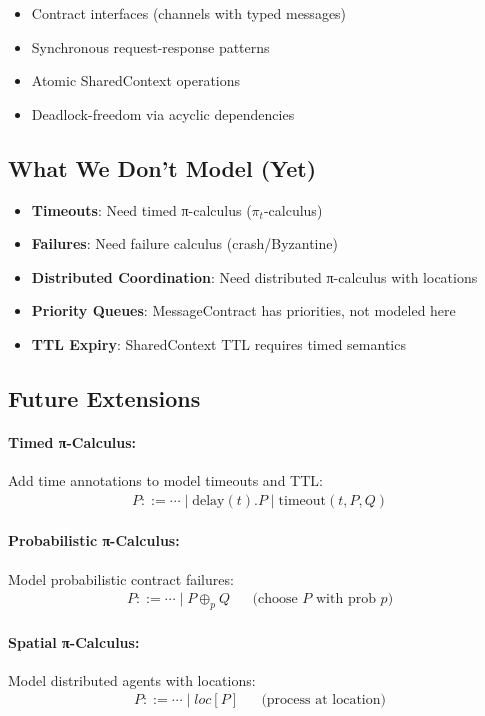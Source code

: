 \documentclass{article}
\begin{document}
\begin{itemize}
\item Contract interfaces (channels with typed messages)
\item Synchronous request-response patterns
\item Atomic SharedContext operations
\item Deadlock-freedom via acyclic dependencies
\end{itemize}

\subsection{What We Don't Model (Yet)}

\begin{itemize}
\item \textbf{Timeouts}: Need timed π-calculus ($\pi_t$-calculus)
\item \textbf{Failures}: Need failure calculus (crash/Byzantine)
\item \textbf{Distributed Coordination}: Need distributed π-calculus with locations
\item \textbf{Priority Queues}: MessageContract has priorities, not modeled here
\item \textbf{TTL Expiry}: SharedContext TTL requires timed semantics
\end{itemize}

\subsection{Future Extensions}

\paragraph{Timed π-Calculus:} Add time annotations to model timeouts and TTL:
\begin{align*}
P ::= \cdots \mid \text{delay}(t).P \mid \text{timeout}(t, P, Q)
\end{align*}

\paragraph{Probabilistic π-Calculus:} Model probabilistic contract failures:
\begin{align*}
P ::= \cdots \mid P \oplus_p Q && \text{(choose $P$ with prob $p$)}
\end{align*}

\paragraph{Spatial π-Calculus:} Model distributed agents with locations:
\begin{align*}
P ::= \cdots \mid loc[P] && \text{(process at location)}
\end{align*}
\end{document}
